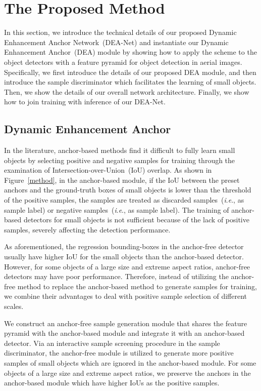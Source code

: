 \documentclass[journal]{IEEEtran}
\newcommand{\ie}{\textit{i}.\textit{e}.}
\begin{document}
\section{The Proposed Method}

In this section, we introduce the technical details of our proposed Dynamic Enhancement Anchor Network~(DEA-Net) and instantiate our Dynamic Enhancement Anchor~(DEA) module by showing how to apply the scheme to the object detectors with a feature pyramid for object detection in aerial images. Specifically, we first introduce the details of our proposed DEA module, and then introduce the sample discriminator which facilitates the learning of small objects. Then, we show the details of our overall network architecture. Finally, we show how to join training with inference of our DEA-Net.

\subsection{Dynamic Enhancement Anchor}\label{sec3.1}

In the literature, anchor-based methods find it difficult to fully learn small objects by selecting positive and negative samples for training through the examination of Intersection-over-Union~(IoU) overlap. As shown in Figure~\ref{method}, in the anchor-based module, if the IoU between the preset anchors and the ground-truth boxes of small objects is lower than the threshold of the positive samples, the samples are treated as discarded samples~(\ie,  as sample label) or negative samples~(\ie,  as sample label). The training of anchor-based detectors for small objects is not sufficient because of the lack of positive samples, severely affecting the detection performance. 

As aforementioned, the regression bounding-boxes in the anchor-free detector usually have higher IoU for the small objects than the anchor-based detector. However, for some objects of a large size and extreme aspect ratios, anchor-free detectors may have poor performance. Therefore, instead of utilizing the anchor-free method to replace the anchor-based method to generate samples for training, we combine their advantages to deal with positive sample selection of different scales.

We construct an anchor-free sample generation module that shares the feature pyramid with the anchor-based module and integrate it with an anchor-based detector.  Via an interactive sample screening procedure in the sample discriminator, the anchor-free module is utilized to generate more positive samples of small objects which are ignored in the anchor-based module. For some objects of a large size and extreme aspect ratios, we preserve the anchors in the anchor-based module which have higher IoUs as the positive samples. 
\end{document}
